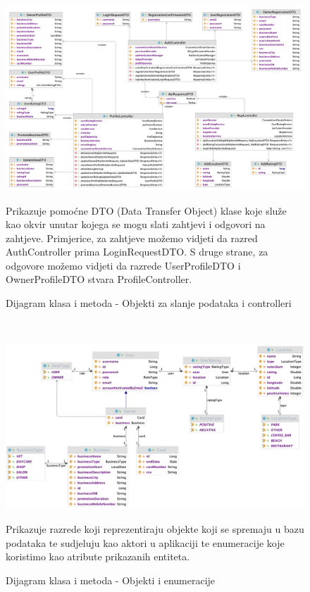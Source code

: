 		    \begin{figure}[H]
			    \includegraphics[width=\textwidth]{slike/DR-dto-controller.png} %
			    \caption{Dijagram klasa i metoda - Objekti za slanje podataka i controlleri}
                {\small Prikazuje pomoćne DTO (Data Transfer Object) klase koje služe kao okvir unutar kojega se mogu slati zahtjevi i odgovori na zahtjeve. Primjerice, za zahtjeve možemo vidjeti da razred AuthController prima LoginRequestDTO. S druge strane, za odgovore možemo vidjeti da razrede UserProfileDTO i OwnerProfileDTO stvara ProfileController.}
			    \label{fig:DTO} %
		    \end{figure}
            \\

            \begin{figure}[H]
                \includegraphics[width=\textwidth]{slike/DR-entities.png} %
                \caption{Dijagram klasa i metoda - Objekti i enumeracije}
                {\small Prikazuje razrede koji reprezentiraju objekte koji se spremaju u bazu podataka te sudjeluju kao aktori u aplikaciji te enumeracije koje koristimo kao atribute prikazanih entiteta.}
                \label{fig:OBJ} %
            \end{figure}
            \\

